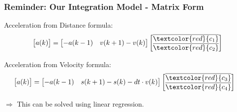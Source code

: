 \begin{frame}
  \frametitle{Reminder: Our Integration Model - Matrix Form}
    Acceleration from Distance formula:
    \begin{align*}
        \begin{bmatrix} a(k) \\ \end{bmatrix}
        &=
        \begin{bmatrix}
            -a(k-1)  & v(k+1) - v(k)   \\ 
        \end{bmatrix}
        \begin{bmatrix}
            \overline{\textcolor{red}{c_1}} \\
            \overline{\textcolor{red}{c_2}} \\
        \end{bmatrix} \\
    \end{align*}

    Acceleration from Velocity formula:
    \begin{align*}
        \begin{bmatrix}
            a(k) \\ 
        \end{bmatrix}
        &=
        \begin{bmatrix}
            -a(k-1) &    s(k+1) - s(k) - dt \cdot  v(k)   \\ 
        \end{bmatrix}
        \begin{bmatrix}
            \overline{\textcolor{red}{c_3}} \\
            \overline{\textcolor{red}{c_4}} \\
        \end{bmatrix}
    \end{align*}

    \hfil

    $\Rightarrow$ This can be solved using linear regression.
\end{frame}

